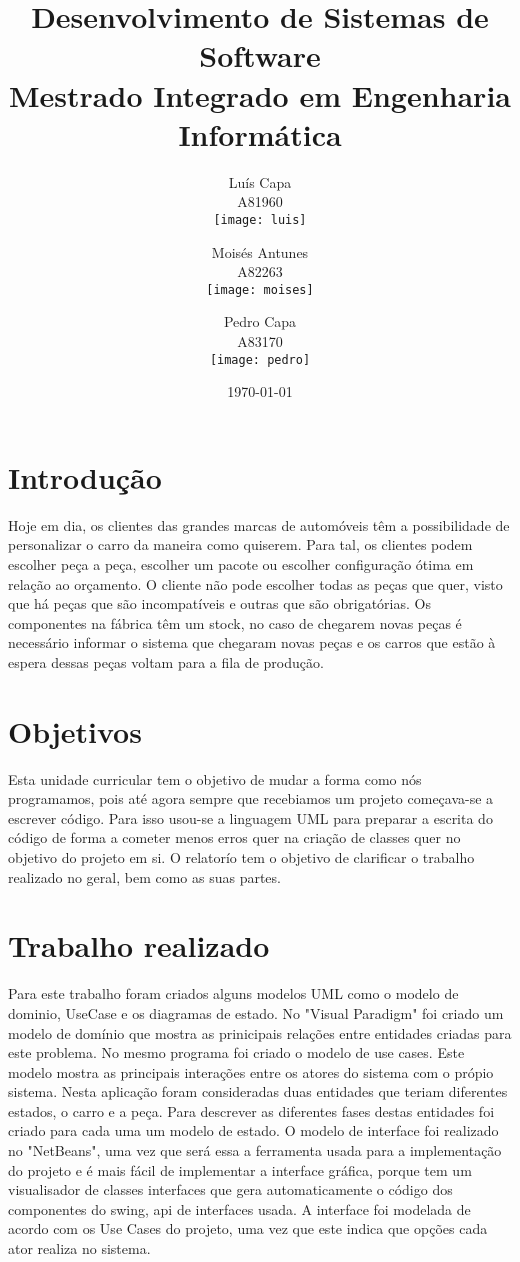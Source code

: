 \documentclass[10pt, a4paper]{report}
\title{Desenvolvimento de Sistemas de Software \\ \large{Mestrado Integrado em Engenharia Informática}}
\author{Luís Capa \\ A81960 \\ \texttt{[image: luis]}
	\and 
	Moisés Antunes \\ A82263 \\ \texttt{[image: moises]}
	\and
	Pedro Capa \\ A83170 \\ \texttt{[image: pedro]}
}
\date{\today}
\begin{document}
\maketitle
\tableofcontents

\chapter{Introdução}\label{Intro}
Hoje em dia, os clientes das grandes marcas de automóveis têm a possibilidade de personalizar o carro da maneira como quiserem. Para tal, os clientes podem escolher peça a peça, escolher um pacote ou escolher configuração ótima em relação ao orçamento. O cliente não pode escolher todas as peças que quer, visto que há peças que são incompatíveis e outras que são obrigatórias. Os componentes na fábrica têm um stock, no caso de chegarem novas peças é necessário informar o sistema que chegaram novas peças e os carros que estão à espera dessas peças voltam para a fila de produção.

\chapter{Objetivos}\label{objetivos}
Esta unidade curricular tem o objetivo de mudar a forma como nós programamos, pois até agora sempre que recebiamos um projeto começava-se a escrever código. Para isso usou-se a linguagem UML para preparar a escrita do código de forma a cometer menos erros quer na criação de classes quer no objetivo do projeto em si. 
O relatorío tem o objetivo de clarificar o trabalho realizado no geral, bem como as suas partes.

\chapter{Trabalho realizado}\label{trabalho}
Para este trabalho foram criados alguns modelos UML como o modelo de dominio, UseCase e os diagramas de estado.
No "Visual Paradigm" foi criado um modelo de domínio que mostra as prinicipais relações entre entidades criadas para este problema. No mesmo programa foi criado o modelo de use cases. Este modelo mostra as principais interações entre os atores do sistema com o própio sistema. Nesta aplicação foram consideradas duas entidades que teriam diferentes estados, o carro e a peça. Para descrever as diferentes fases destas entidades foi criado para cada uma um modelo de estado.
O modelo de interface foi realizado no "NetBeans", uma vez que será essa a ferramenta usada para a implementação do projeto e é mais fácil de implementar a interface gráfica, porque tem um visualisador de classes interfaces que gera automaticamente o código dos componentes do swing, api de interfaces usada. A interface foi modelada de acordo com os Use Cases do projeto, uma vez que este indica que opções cada ator realiza no sistema.
\end{document}
